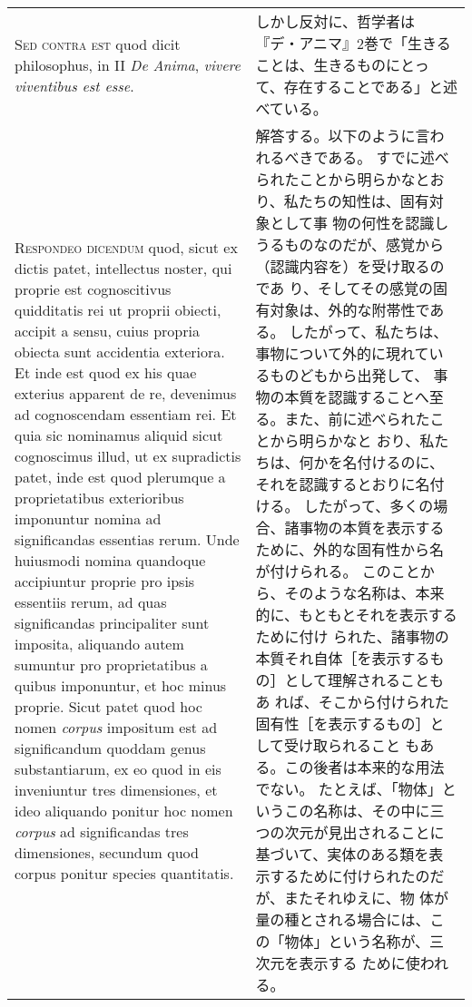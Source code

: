 \documentclass[10pt]{jsarticle} %
\begin{document}
\begin{longtable}{p{21em}p{21em}}
{\scshape  Sed contra est} quod dicit philosophus, in II {\itshape De Anima},
 {\itshape vivere viventibus est esse}.


&

しかし反対に、哲学者は『デ・アニマ』2巻で「生きることは、生きるものにとっ
 て、存在することである」と述べている。


\\



{\scshape Respondeo dicendum} quod, sicut ex dictis patet, intellectus
 noster, qui proprie est cognoscitivus quidditatis rei ut proprii
 obiecti, accipit a sensu, cuius propria obiecta sunt accidentia
 exteriora. Et inde est quod ex his quae exterius apparent de re,
 devenimus ad cognoscendam essentiam rei. Et quia sic nominamus aliquid
 sicut cognoscimus illud, ut ex supradictis patet, inde est quod
 plerumque a proprietatibus exterioribus imponuntur nomina ad
 significandas essentias rerum. Unde huiusmodi nomina quandoque
 accipiuntur proprie pro ipsis essentiis rerum, ad quas significandas
 principaliter sunt imposita, aliquando autem sumuntur pro
 proprietatibus a quibus imponuntur, et hoc minus proprie. Sicut patet
 quod hoc nomen {\itshape corpus} impositum est ad significandum quoddam
 genus substantiarum, ex eo quod in eis inveniuntur tres dimensiones, et
 ideo aliquando ponitur hoc nomen {\itshape corpus} ad significandas
 tres dimensiones, secundum quod corpus ponitur species quantitatis.


&

解答する。以下のように言われるべきである。
すでに述べられたことから明らかなとおり、私たちの知性は、固有対象として事
物の何性を認識しうるものなのだが、感覚から（認識内容を）を受け取るのであ
 り、そしてその感覚の固有対象は、外的な附帯性である。
したがって、私たちは、事物について外的に現れているものどもから出発して、
 事物の本質を認識することへ至る。また、前に述べられたことから明らかなと
 おり、私たちは、何かを名付けるのに、それを認識するとおりに名付ける。
したがって、多くの場合、諸事物の本質を表示するために、外的な固有性から名
 が付けられる。
このことから、そのような名称は、本来的に、もともとそれを表示するために付け
 られた、諸事物の本質それ自体［を表示するもの］として理解されることもあ
 れば、そこから付けられた固有性［を表示するもの］として受け取られること
 もある。この後者は本来的な用法でない。
たとえば、「物体」というこの名称は、その中に三つの次元が見出されることに
 基づいて、実体のある類を表示するために付けられたのだが、またそれゆえに、物
 体が量の種とされる場合には、この「物体」という名称が、三次元を表示する
 ために使われる。




\end{longtable}
\end{document}
